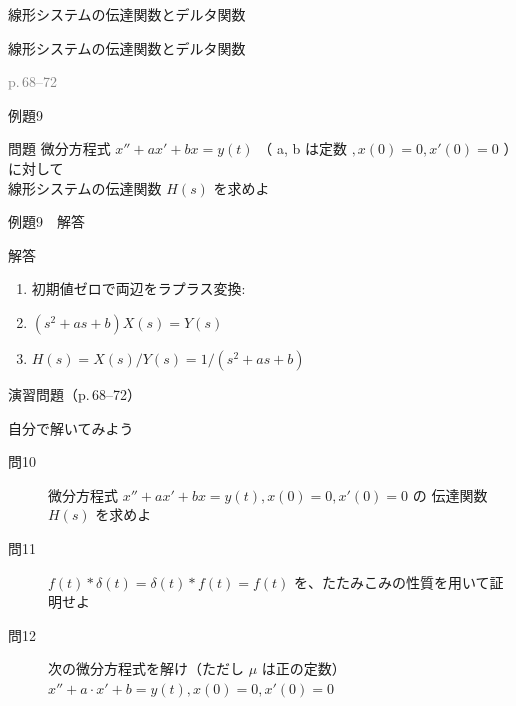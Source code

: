 \documentclass[aspectratio=43,professionalfonts,handout]{beamer}
\begin{document}
\begin{frame}{線形システムの伝達関数とデルタ関数}
  \begin{block}{}
  {\large 線形システムの伝達関数とデルタ関数}
  \end{block}
  \vfill\hfill{\scriptsize \textcolor{gray}{p.\,68--72}}
\end{frame}

\begin{frame}{例題9}
  \begin{exampleblock}{問題}
    微分方程式 $x'' + ax' + bx = y(t)$ （ a, b は定数 $, x(0)=0, x'(0)=0$ ）に対して\\[2pt]
    線形システムの伝達関数 $H(s)$ を求めよ\\[2pt]
  \end{exampleblock}
\end{frame}

\begin{frame}{例題9　解答}
  \begin{exampleblock}{解答}
  \begin{enumerate}[1.]
    \item[] 初期値ゼロで両辺をラプラス変換:
    \item[] $(s^{2}+as+b)X(s) = Y(s)$
    \item[] $H(s) = X(s)/Y(s) = 1/(s^{2}+as+b)$
  \end{enumerate}
  \end{exampleblock}
\end{frame}

\begin{frame}{演習問題（p.\,68--72）}
  \begin{exampleblock}{自分で解いてみよう}
  \begin{description}
    \item[問10] 微分方程式 $x'' + ax' + bx = y(t), x(0)=0, x'(0)=0$ の
    伝達関数 $H(s)$ を求めよ\\
    \item[問11] $f(t)*\delta(t) = \delta(t)*f(t) = f(t)$ を、たたみこみの性質を用いて証明せよ
    \item[問12] 次の微分方程式を解け（ただし $\mu$ は正の定数）
    $x'' + a\cdot x' + b = y(t),  x(0) = 0,  x'(0) = 0$\\
  \end{description}
  \end{exampleblock}
\end{frame}
\end{document}
